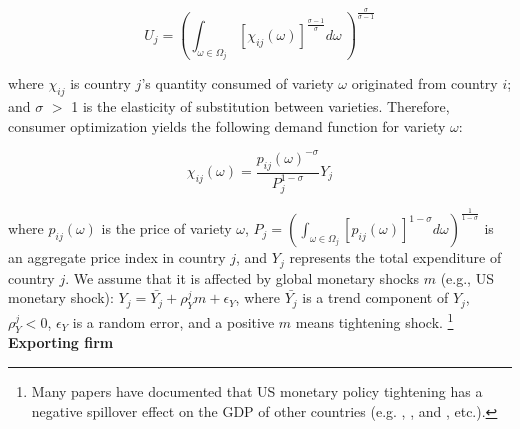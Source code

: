 \documentclass[12pt]{article}
\begin{document}
$$
U_j=(\int_{\omega \in \Omega_j} [\chi_{ij}(\omega)]^{\frac{\sigma-1}{\sigma}} d\omega\ )^\frac{\sigma}{\sigma-1}
$$

where $\chi_{ij}$ is country $j$’s quantity consumed of variety $\omega$ originated from country $i$; and $\sigma$ $>$ 1 is the elasticity of substitution between varieties. Therefore, consumer optimization yields the following demand function for variety $\omega$:

$$
\chi_{ij}(\omega)=\frac{p_{ij}(\omega)^{-\sigma}}{P_j^{1-\sigma}} Y_j
$$


where $p_{ij}(\omega)$ is the price of variety $\omega$, $P_j=(\int_{\omega \in \Omega_j} [p_{ij}(\omega)]^{1-\sigma} d \omega)^{\frac{1}{1-\sigma}}$ is an aggregate price index in country $j$, and $Y_j$ represents the total expenditure of country $j$. We assume that it is affected by global monetary shocks $m$ (e.g., US monetary shock): $Y_j=\bar{Y_j}+\rho_{Y}^j m+\epsilon_Y$, where $\bar{Y_j}$ is a trend component of $Y_j$, $\rho_{Y}^j<0$, $\epsilon_Y$ is a random error, and a positive $m$ means tightening shock. \footnote{Many papers have documented that US monetary policy tightening has a negative spillover effect on the GDP of other countries (e.g. \cite{kim2001international}, \cite{georgiadis2016determinants}, and \cite{iacoviello2019foreign}, etc.).} \\
 

\textbf{Exporting firm}
\end{document}
